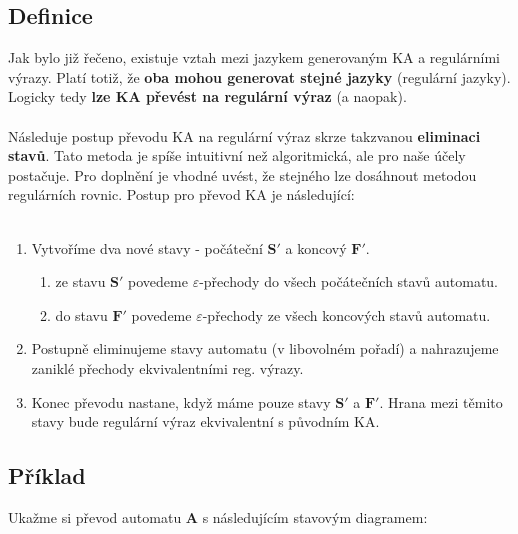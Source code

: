 \documentclass{report}
\begin{document}
\subsection*{Definice}
Jak bylo již řečeno, existuje vztah mezi jazykem generovaným KA a regulárními výrazy. Platí totiž, že \textbf{oba mohou generovat stejné jazyky} (regulární jazyky). Logicky tedy \textbf{lze KA převést na regulární výraz} (a naopak). \\ \\
Následuje postup převodu KA na regulární výraz skrze takzvanou \textbf{eliminaci stavů}. Tato metoda je spíše intuitivní než algoritmická, ale pro naše účely postačuje. Pro doplnění je vhodné uvést, že stejného lze dosáhnout metodou regulárních rovnic. Postup pro převod KA je následující: \\ \\
\begin{enumerate}
    \item Vytvoříme dva nové stavy -  počáteční $\mathbf{S'}$ a koncový $\mathbf{F'}$.
        \begin{enumerate}
              \item ze stavu $\mathbf{S'}$ povedeme $\varepsilon$-přechody do všech počátečních stavů automatu.
              \item do stavu $\mathbf{F'}$ povedeme $\varepsilon$-přechody ze všech koncových stavů automatu.
        \end{enumerate}
    \item Postupně eliminujeme stavy automatu (v libovolném pořadí) a nahrazujeme zaniklé přechody ekvivalentními reg. výrazy.
    \item Konec převodu nastane, když máme pouze stavy $\mathbf{S'}$ a $\mathbf{F'}$. Hrana mezi těmito stavy bude regulární výraz ekvivalentní s původním KA.
\end{enumerate}
\subsection*{Příklad}
Ukažme si převod automatu \textbf{A} s následujícím stavovým diagramem:\\ \\
\begin{center}
    \end{center}
    \\ \\
    
\end{document}
